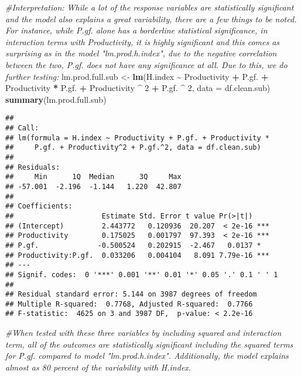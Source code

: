 \documentclass[
]{article}
\newenvironment{Shaded}{\begin{snugshade}}{\end{snugshade}}
\newcommand{\AttributeTok}[1]{\textcolor[rgb]{0.13,0.29,0.53}{#1}}
\newcommand{\CommentTok}[1]{\textcolor[rgb]{0.56,0.35,0.01}{\textit{#1}}}
\newcommand{\DecValTok}[1]{\textcolor[rgb]{0.00,0.00,0.81}{#1}}
\newcommand{\FunctionTok}[1]{\textcolor[rgb]{0.13,0.29,0.53}{\textbf{#1}}}
\newcommand{\NormalTok}[1]{#1}
\newcommand{\OtherTok}[1]{\textcolor[rgb]{0.56,0.35,0.01}{#1}}
\newcommand{\SpecialCharTok}[1]{\textcolor[rgb]{0.81,0.36,0.00}{\textbf{#1}}}
\begin{document}
\begin{Shaded}
\begin{Highlighting}[]
\CommentTok{\#Interpretation: While a lot of the response variables are statistically significant and the model also explains a great variability, there are a few things to be noted. For instance, while P.gf. alone has a borderline statistical significance, in interaction terms with Productivity, it is highly significant and this comes as surprising as in the model "lm.prod.h.index", due to the negative correlation between the two, P.gf. does not have any significance at all. Due to this, we do further testing:}
\NormalTok{lm.prod.full.sub }\OtherTok{\textless{}{-}} \FunctionTok{lm}\NormalTok{(H.index }\SpecialCharTok{\textasciitilde{}}\NormalTok{ Productivity }\SpecialCharTok{+}\NormalTok{ P.gf. }\SpecialCharTok{+}\NormalTok{ Productivity }\SpecialCharTok{*}\NormalTok{ P.gf. }\SpecialCharTok{+}\NormalTok{ Productivity }\SpecialCharTok{\^{}} \DecValTok{2} \SpecialCharTok{+}\NormalTok{ P.gf. }\SpecialCharTok{\^{}} \DecValTok{2}\NormalTok{, }\AttributeTok{data =}\NormalTok{ df.clean.sub)}
\FunctionTok{summary}\NormalTok{(lm.prod.full.sub)}
\end{Highlighting}
\end{Shaded}

\begin{verbatim}
## 
## Call:
## lm(formula = H.index ~ Productivity + P.gf. + Productivity * 
##     P.gf. + Productivity^2 + P.gf.^2, data = df.clean.sub)
## 
## Residuals:
##     Min      1Q  Median      3Q     Max 
## -57.001  -2.196  -1.144   1.220  42.807 
## 
## Coefficients:
##                     Estimate Std. Error t value Pr(>|t|)    
## (Intercept)         2.443772   0.120936  20.207  < 2e-16 ***
## Productivity        0.175025   0.001797  97.393  < 2e-16 ***
## P.gf.              -0.500524   0.202915  -2.467   0.0137 *  
## Productivity:P.gf.  0.033206   0.004104   8.091 7.79e-16 ***
## ---
## Signif. codes:  0 '***' 0.001 '**' 0.01 '*' 0.05 '.' 0.1 ' ' 1
## 
## Residual standard error: 5.144 on 3987 degrees of freedom
## Multiple R-squared:  0.7768, Adjusted R-squared:  0.7766 
## F-statistic:  4625 on 3 and 3987 DF,  p-value: < 2.2e-16
\end{verbatim}

\begin{Shaded}
\begin{Highlighting}[]
\CommentTok{\#When tested with these three variables by including squared and interaction term, all of the outcomes are statistically significant including the squared terms for P.gf. compared to model "lm.prod.h.index". Additionally, the model explains almost as 80 percent of the variability with H.index.}
\end{Highlighting}
\end{Shaded}
\end{document}
